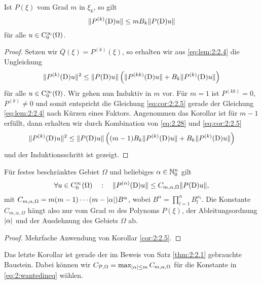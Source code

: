 \begin{cor}\label{cor:2:2.5}
Ist $P(\xi)$ vom Grad $m$ in $\xi_k$, so gilt
\begin{equation}\label{eq:cor:2:2.5}
\lVert P^{(k)}(\mathrm D)u\rVert\leq mB_k\lVert P(\mathrm D)u\rVert
\end{equation}
für alle $u\in\mathrm C_0^\infty(\Omega)$.
\end{cor}
\begin{proof}
Setzen wir $\overline{Q}(\xi)=P^{(k)}(\xi)$, so erhalten wir aus \eqref{eq:lem:2:2.4} die Ungleichung
\begin{equation}\label{eq:2.28}
\lVert P^{(k)}(\mathrm D)u\rVert^2\leq\lVert P(\mathrm D)u\rVert\left(\lVert P^{(kk)}(\mathrm D)u\rVert+B_k\lVert P^{(k)}(\mathrm D)u\rVert\right)
\end{equation}
für alle $u\in\mathrm C_0^\infty(\Omega)$. Wir gehen nun Induktiv in $m$ vor.
Für $m=1$ ist $P^{(kk)}=0$, $P^{(k)}\neq0$ und somit entspricht die Gleichung \eqref{eq:cor:2:2.5}
gerade der Gleichung \eqref{eq:lem:2:2.4} nach Kürzen eines Faktors.
Angenommen das Korollar ist für $m-1$ erfüllt,
dann erhalten wir durch Kombination von \eqref{eq:2.28} und \eqref{eq:cor:2:2.5}
\begin{equation}
\lVert P^{(k)}(\mathrm D)u\rVert^2\leq\lVert P(\mathrm D)u\rVert\left((m-1)B_k\lVert P^{(k)}(\mathrm D)u\rVert+B_k\lVert P^{(k)}(\mathrm D)u\rVert\right)
\end{equation}
und der Induktionsschritt  ist gezeigt.
\end{proof}

\begin{cor}\label{cor:2:2.6}
Für festes beschränktes Gebiet $\Omega$ und beliebiges $\alpha\in\mathbb N^n_0$ gilt
\begin{equation}
\forall u\in\mathrm C_0^\infty(\Omega)\quad:\quad \lVert P^{(\alpha)}(\mathrm D)u\rVert\leq C_{m,\alpha,\Omega}\lVert P(\mathrm D)u\rVert,
\end{equation}
mit $C_{m,\alpha,\Omega}=m(m-1)\cdots(m-\lvert\alpha\rvert)B^\alpha$, wobei $B^\alpha=\prod_{l=1}^n B^{\alpha_l}_l$.
Die Konstante $C_{m,\alpha,\Omega}$ hängt also nur vom Grad $m$ des Polynoms $P(\xi)$,
der Ableitungsordnung $\lvert\alpha\rvert$ und der Ausdehnung des Gebiets $\Omega$ ab.
\end{cor}

\begin{proof}
Mehrfache Anwendung von Korollar \ref{cor:2:2.5}.
\end{proof}

Das letzte Korollar ist gerade der im Beweis
von Satz \ref{thm:2:2.1} gebrauchte Baustein.
Dabei können wir $C_{\mathcal P,\Omega}=\max_{|\alpha|\le m} C_{m,\alpha,\Omega}$
für die Konstante in \eqref{eq:2:wantedineq} wählen.

